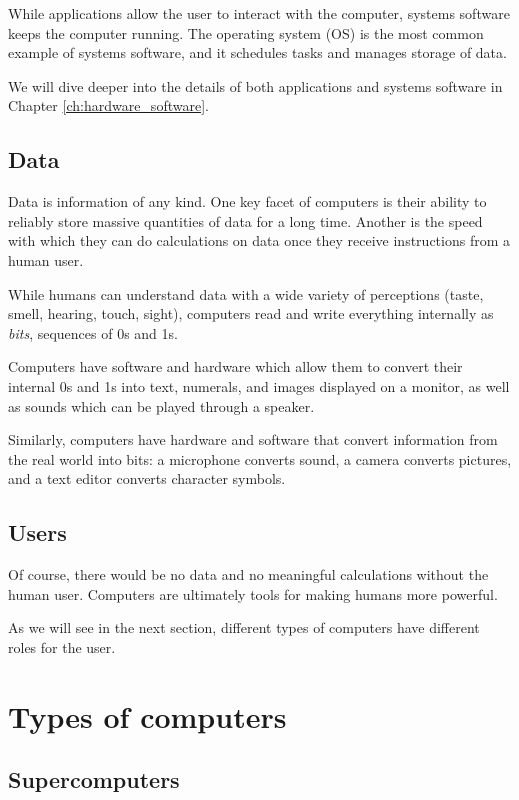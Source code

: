While applications allow the user to interact with the computer, systems software keeps the computer running. The operating system (OS) is the most common example of systems software, and it schedules tasks and manages storage of data.

We will dive deeper into the details of both applications and systems software in Chapter \ref{ch:hardware_software}.

\subsection{Data}
Data is information of any kind. One key facet of computers is their ability to reliably store massive quantities of data for a long time. Another is the speed with which they can do calculations on data once they receive instructions from a human user.

While humans can understand data with a wide variety of perceptions (taste,
smell, hearing, touch, sight), computers read and write everything internally as
\textit{bits}, sequences of 0s and 1s.

Computers have software and hardware which allow them to convert their internal 0s and 1s into text, numerals, and images displayed on a monitor, as well as sounds which can be played through a speaker.

Similarly, computers have hardware and software that convert information from
the real world into bits: a microphone converts sound, a camera converts pictures, and a text editor converts character symbols.

\subsection{Users}

Of course, there would be no data and no meaningful calculations without the human user. Computers are ultimately tools for making humans more powerful.

As we will see in the next section, different types of computers have different roles for the user.

\section{Types of computers}

\subsection{Supercomputers}

